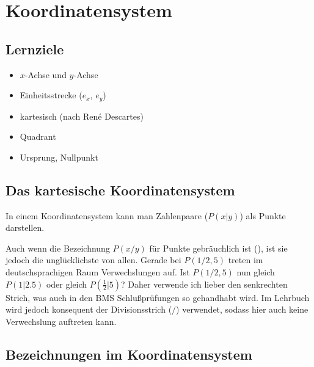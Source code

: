 
\section{Koordinatensystem}
\subsection*{Lernziele}

\begin{itemize}
\item $x$-Achse und $y$-Achse
\item Einheitsstrecke ($e_x$, $e_y$)
\item kartesisch (nach René Descartes)
\item Quadrant 
\item Ursprung, Nullpunkt
\end{itemize}


\subsection{Das kartesische Koordinatensystem}
In einem Koordinatensystem kann man Zahlenpaare ($P(x|y)$) als Punkte
darstellen.

\begin{bemerkung}{}{}
  Auch wenn die Bezeichnung $P(x/y)$ für Punkte gebräuchlich ist (\cite{frommenwiler17alg}), ist
  sie jedoch die unglücklichste von allen. Gerade bei $P(1/2,5)$
  treten im deutschsprachigen Raum Verwechslungen auf. Ist $P(1/2,5)$
  nun gleich $P(1 | 2.5)$ oder gleich $P(\frac{1}{2} | 5)$?
  Daher verwende ich lieber den senkrechten Strich, was auch in den
  BMS Schlußprüfungen so gehandhabt wird. Im Lehrbuch wird jedoch
  konsequent der Divisionsstrich ($/$) verwendet, sodass hier auch
  keine Verwechslung auftreten kann.
\end{bemerkung}
\newpage

\subsection{Bezeichnungen im Koordinatensystem}

